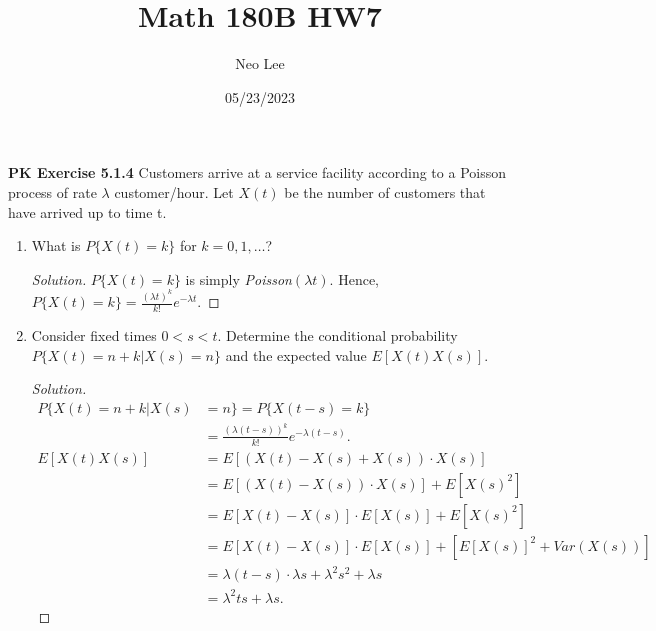 \documentclass{article}
\title{Math 180B HW7}
\author{Neo Lee}
\date{05/23/2023}
\begin{document}
 

\maketitle 

\textbf{PK Exercise 5.1.4}
Customers arrive at a service facility according to a Poisson process of rate $\lambda$
customer/hour. Let $X(t)$ be the number of customers that have arrived up to time t.
\begin{enumerate}[label=(\alph*)]
    \item What is $P\{X(t) = k\}$ for $k = 0,1,\dots$?
    \begin{proof}[Solution]
        $P\{X(t)=k\}$ is simply \emph{Poisson}$(\lambda t)$.
        Hence, $P\{X(t)=k\} = \frac{(\lambda t)^k}{k!}e^{-\lambda t}$.
    \end{proof}

    \item Consider fixed times $0<s<t$. Determine the conditional probability
    $P\{X(t) = n + k|X(s) = n\}$ and the expected value $E[X(t)X(s)]$.
    \begin{proof}[Solution]
        \begin{align*}
            P\{X(t) = n + k|X(s) & = n\} = P\{X(t-s) = k\} \\
            & = \frac{(\lambda (t-s))^k}{k!}e^{-\lambda (t-s)}. \\
            E[X(t)X(s)] & = E[\left(X(t) - X(s) + X(s)\right)\cdot X(s)] \\
            & = E[(X(t) - X(s))\cdot X(s)] + E[X(s)^2] \\
            & = E[X(t) - X(s)]\cdot E[X(s)] + E[X(s)^2] \\
            & = E[X(t) - X(s)]\cdot E[X(s)] + \left[E[X(s)]^2 + Var(X(s))\right] \\
            & = \lambda(t-s)\cdot\lambda s + \lambda^2 s^2 + \lambda s \\
            & = \lambda^2 ts + \lambda s.
        \end{align*}
    \end{proof}
\end{enumerate}
\bigbreak
\end{document}
